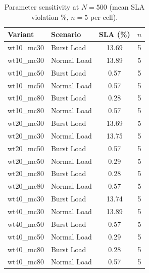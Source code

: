 \begin{table}[!t]
\centering
\caption{Parameter sensitivity at $N=500$ (mean SLA violation \%, $n=5$ per cell).}
\label{tab:sensitivity}
\fgcsTableCol
\begin{tabular*}{\columnwidth}{@{\extracolsep{\fill}}llcc@{}}
\toprule
\textbf{Variant} & \textbf{Scenario} & \textbf{SLA (\%)} & \textbf{$n$} \\
\midrule
wt10\_mc30 & Burst Load & 13.69 & 5 \\
wt10\_mc30 & Normal Load & 13.89 & 5 \\
wt10\_mc50 & Burst Load & 0.57 & 5 \\
wt10\_mc50 & Normal Load & 0.57 & 5 \\
wt10\_mc80 & Burst Load & 0.28 & 5 \\
wt10\_mc80 & Normal Load & 0.57 & 5 \\
wt20\_mc30 & Burst Load & 13.69 & 5 \\
wt20\_mc30 & Normal Load & 13.75 & 5 \\
wt20\_mc50 & Burst Load & 0.57 & 5 \\
wt20\_mc50 & Normal Load & 0.29 & 5 \\
wt20\_mc80 & Burst Load & 0.28 & 5 \\
wt20\_mc80 & Normal Load & 0.57 & 5 \\
wt40\_mc30 & Burst Load & 13.74 & 5 \\
wt40\_mc30 & Normal Load & 13.89 & 5 \\
wt40\_mc50 & Burst Load & 0.57 & 5 \\
wt40\_mc50 & Normal Load & 0.29 & 5 \\
wt40\_mc80 & Burst Load & 0.28 & 5 \\
wt40\_mc80 & Normal Load & 0.57 & 5 \\
\bottomrule
\end{tabular*}
\end{table}